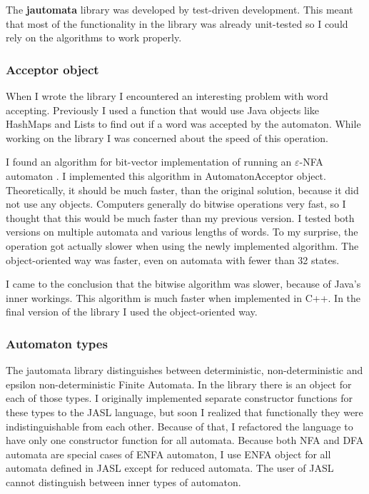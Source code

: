 \documentclass{ctuthesis}
\begin{document}
The \textbf{jautomata} library was developed by test-driven development. This meant that most of the functionality in the library was already unit-tested so I could rely on the algorithms to work properly. 

\subsubsection{Acceptor object}
When I wrote the library I encountered an interesting problem with word accepting. Previously I used a function that would use Java objects like HashMaps and Lists to find out if a word was accepted by the automaton. While working on the library I was concerned about the speed of this operation. 

I found an algorithm for bit-vector implementation of running an $\varepsilon$-NFA automaton \cite{acceptor-algorithm}. I implemented this algorithm in AutomatonAcceptor object. Theoretically, it should be much faster, than the original solution, because it did not use any objects. Computers generally do bitwise operations very fast, so I thought that this would be much faster than my previous version. I tested both versions on multiple automata and various lengths of words. To my surprise, the operation got actually slower when using the newly implemented algorithm. The object-oriented way was faster, even on automata with fewer than 32 states. 

I came to the conclusion that the bitwise algorithm was slower, because of Java's inner workings. This algorithm is much faster when implemented in C++. In the final version of the library I used the object-oriented way.

\subsubsection{Automaton types}
The jautomata library distinguishes between deterministic, non-deterministic and epsilon non-deterministic Finite Automata. In the library there is an object for each of those types. I originally implemented separate constructor functions for these types to the JASL language, but soon I realized that functionally they were indistinguishable from each other. Because of that, I refactored the language to have only one constructor function for all automata. Because both NFA and DFA automata are special cases of ENFA automaton, I use ENFA object for all automata defined in JASL except for reduced automata. The user of JASL cannot distinguish between inner types of automaton.
\end{document}
